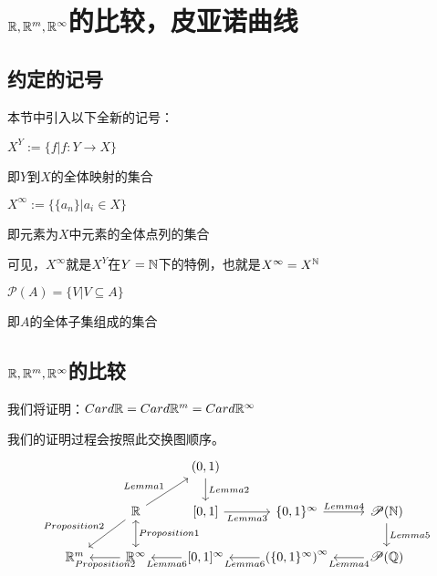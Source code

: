 \documentclass[12pt, a4paper, oneside, UTF8]{ctexbook}
\begin{document}
	\section{\texorpdfstring{$\mathbb{R},\mathbb{R}^m,\mathbb{R}^\infty$}势的比较，皮亚诺曲线}
		\subsection{约定的记号}
			本节中引入以下全新的记号：
			\begin{para}{0}
					\begin{defn}{}{}
						$X^Y := \{f| f:Y \rightarrow X\}$
						
						即$Y$到$X$的全体映射的集合
					\end{defn}
					\begin{defn}{}{}
						$X^\infty := \{\{a_n\}| a_i\in X\}$
						
						即元素为$X$中元素的全体点列的集合
					\end{defn}
					可见，$X^\infty$就是$X^Y$在$Y=\mathbb{N}$下的特例，也就是$X^{\infty}=X^{\mathbb{N}}$
					\begin{defn}{}{}
						$\mathscr{P}(A) = \{V|V \subseteq A\}$
						
						即$A$的全体子集组成的集合
					\end{defn}
			\end{para}
			
		\subsection{\texorpdfstring{$\mathbb{R},\mathbb{R}^m,\mathbb{R}^\infty$}势的比较}
			我们将证明：$Card \mathbb{R} = Card \mathbb{R}^m = Card \mathbb{R}^\infty$
			
			我们的证明过程会按照此交换图顺序。
			\[\begin{tikzcd}
				&& {(0,1)} \\
				& {\mathbb{R}} & {[0,1]} & {\{0,1\}^{\infty}} & {\mathscr{P}(\mathbb{N})} \\
				{\mathbb{R}^m} & {\mathbb{R}^\infty} & {[0,1]^\infty} & {\left(\{0,1\}^{\infty}\right)^\infty} & {\mathscr{P}(\mathbb{Q})}
				\arrow["{Lemma2}", from=1-3, to=2-3]
				\arrow["{Lemma1}", from=2-2, to=1-3]
				\arrow["{Proposition2}"', from=2-2, to=3-1]
				\arrow["{Proposition1}", leftrightarrow, from=2-2, to=3-2]
				\arrow["{Lemma3}"', from=2-3, to=2-4]
				\arrow["{Lemma4}", from=2-4, to=2-5]
				\arrow["{Lemma5}", from=2-5, to=3-5]
				\arrow["{Proposition2}", from=3-2, to=3-1]
				\arrow["{Lemma6}", from=3-3, to=3-2]
				\arrow["{Lemma6}", from=3-4, to=3-3]
				\arrow["{Lemma4}", from=3-5, to=3-4]
			\end{tikzcd}\]
			
\end{document}
